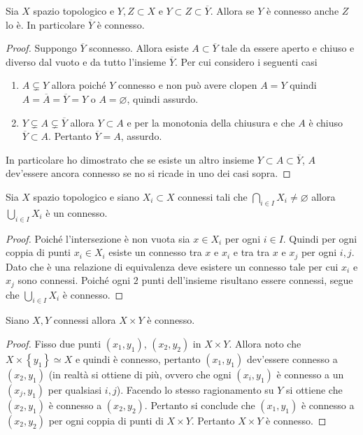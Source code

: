 \begin{theorem}
	Sia $X$ spazio topologico e $Y, Z \subset X$ e $Y \subset Z\subset \overline{Y}$. Allora se $Y$ è connesso anche $Z$ lo è. In particolare $\overline{Y}$ è connesso.
\end{theorem} 
\begin{proof}
	Suppongo $\overline{Y}$ sconnesso. Allora esiste $A \subset \overline{Y}$ tale da essere aperto e chiuso e diverso dal vuoto e da tutto l'insieme $\overline{Y}$. Per cui considero i seguenti casi
	\begin{enumerate}
		\item $A \subsetneq Y$ allora poiché $Y$ connesso e non può avere clopen $A = Y$ quindi $A = \overline{A} = \overline{Y} = Y$ o $A = \varnothing$, quindi assurdo.
		\item $Y \subsetneq A \subsetneq \overline{Y}$ allora $Y \subset A$ e per la monotonia della chiusura e che $A$ è chiuso $\overline{Y} \subset A$. Pertanto $\overline{Y}= A$, assurdo. 
	\end{enumerate}
	In particolare ho dimostrato che se esiste un altro insieme $Y \subset A \subset \overline{Y}$, $A$ dev'essere ancora connesso se no si ricade in uno dei casi sopra.
\end{proof}

\begin{theorem}
	Sia $X$ spazio topologico e siano $X_i \subset X$ connessi tali che $\bigcap_{i \in I} X_i \neq \varnothing$ allora $\bigcup_{i \in I} X_i$ è un connesso. 
\end{theorem} 
\begin{proof}
	Poiché l'intersezione è non vuota sia $x \in X_i$ per ogni $i \in I$. Quindi per ogni coppia di punti $x_i \in X_i$ esiste un connesso tra $x$ e $x_i$ e tra tra $x$ e $x_j$ per ogni $i, j$. Dato che è una relazione di equivalenza deve esistere un connesso tale per cui $x_i$ e $x_j$ sono connessi. Poiché ogni $2$ punti dell'insieme risultano essere connessi, segue che $\bigcup_{i \in I} X_i$ è connesso.
\end{proof}

\begin{theorem}
	Siano $X, Y$ connessi allora $X\times Y$ è connesso. 
\end{theorem} 
\begin{proof}
	Fisso due punti $(x_1, y_1)$, $(x_2, y_2)$ in $X \times Y$. Allora noto che $X \times \left\{y_1\right\} \simeq X$ e quindi è connesso, pertanto $(x_1, y_1)$ dev'essere connesso a $(x_2, y_1)$ (in realtà si ottiene di più, ovvero che ogni $(x_i, y_1)$ è connesso a un $(x_j, y_1)$ per qualsiasi $i,j$). Facendo lo stesso ragionamento su $Y$ si ottiene che $(x_2, y_1)$ è connesso a $(x_2, y_2)$. Pertanto si conclude che $(x_1, y_1)$ è connesso a $(x_2, y_2)$ per ogni coppia di punti di $X \times Y$. Pertanto $X \times Y$ è connesso.
\end{proof}

